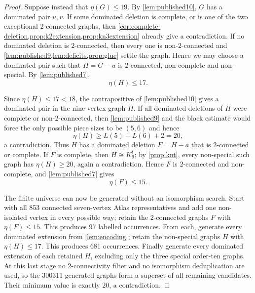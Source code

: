 \documentclass[11pt,reqno]{amsart}
\theoremstyle{definition}
\theoremstyle{remark}
\begin{document}
\begin{proof}
Suppose instead that $\eta(G)\le19$.  By \cref{lem:published10}, $G$ has a
dominated pair $u,v$.  If some dominated deletion is complete, or is one of the two exceptional
$2$-connected graphs, then
\cref{cor:complete-deletion,prop:k2extension,prop:kn3extension} already give
a contradiction.  If no dominated deletion is $2$-connected, then every one
is non-$2$-connected and \cref{lem:published9,lem:deficits,prop:glue} settle
the graph.  Hence we may choose a dominated pair such that $H=G-u$ is
$2$-connected, non-complete and non-special.  By \cref{lem:published7},
\[
  \eta(H)\le17.
\]

Since $\eta(H)\le17<18$, the contrapositive of
\cref{lem:published10} gives a dominated pair in the nine-vertex graph $H$.
If all dominated deletions of $H$ were complete or non-$2$-connected, then
\cref{lem:published9} and the block estimate would force the only possible
piece sizes to be $(5,6)$ and hence
\[
 \eta(H)\ge L(5)+L(6)+2=20,
\]
a contradiction.  Thus $H$ has a dominated deletion $F=H-a$ that is
$2$-connected or complete.  If $F$ is complete, then $H\cong K_9^t$; by
\cref{prop:knt}, every non-special such graph has $\eta(H)\ge20$, again a
contradiction.  Hence $F$ is $2$-connected and non-complete, and
\cref{lem:published7} gives
\[
  \eta(F)\le15.
\]

The finite universe can now be generated without an isomorphism search.
Start with all 853 connected seven-vertex Atlas representatives and add one
non-isolated vertex in every possible way; retain the $2$-connected graphs
$F$ with $\eta(F)\le15$.  This produces 97 labelled occurrences.  From each,
generate every dominated extension from \cref{lem:encoding}; retain the
non-special graphs $H$ with $\eta(H)\le17$.  This produces 681 occurrences.
Finally generate every dominated extension of each retained $H$, excluding
only the three special order-ten graphs.  At this last stage no
$2$-connectivity filter and no isomorphism deduplication are used, so the
300311 generated graphs form a superset of all remaining candidates.  Their
minimum value is exactly $20$, a contradiction.
\end{proof}
\end{document}
